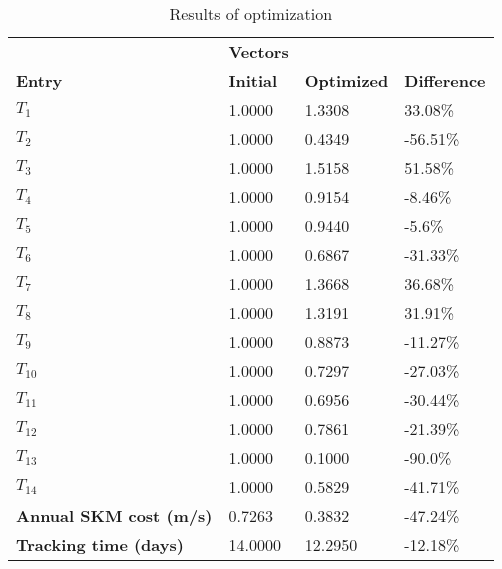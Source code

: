 \begin{table}[H]
\centering
\begin{tabular}{llll}
\textbf{}      & \cellcolor[HTML]{EFEFEF}\textbf{Vectors} & \textbf{} & \textbf{}         \\
\rowcolor[HTML]{EFEFEF} 
\textbf{Entry} & \textbf{Initial} & \textbf{Optimized} & \textbf{Difference} \\
$T_1$ & 1.0000 & 1.3308 & 33.08\% \\ 
$T_2$ & 1.0000 & 0.4349 & -56.51\% \\ 
$T_3$ & 1.0000 & 1.5158 & 51.58\% \\ 
$T_4$ & 1.0000 & 0.9154 & -8.46\% \\ 
$T_5$ & 1.0000 & 0.9440 & -5.6\% \\ 
$T_6$ & 1.0000 & 0.6867 & -31.33\% \\ 
$T_7$ & 1.0000 & 1.3668 & 36.68\% \\ 
$T_8$ & 1.0000 & 1.3191 & 31.91\% \\ 
$T_9$ & 1.0000 & 0.8873 & -11.27\% \\ 
$T_10$ & 1.0000 & 0.7297 & -27.03\% \\ 
$T_11$ & 1.0000 & 0.6956 & -30.44\% \\ 
$T_12$ & 1.0000 & 0.7861 & -21.39\% \\ 
$T_13$ & 1.0000 & 0.1000 & -90.0\% \\ 
$T_14$ & 1.0000 & 0.5829 & -41.71\% \\ 
\rowcolor[HTML]{EFEFEF} 
\textbf{Annual SKM cost (m/s)}  & 0.7263 & 0.3832 & -47.24\% \\ 
\rowcolor[HTML]{EFEFEF} 
\textbf{Tracking time (days)}  & 14.0000 & 12.2950 & -12.18\% \\ 
\end{tabular}
\caption{Results of optimization}
\label{tab:OptimizationAnalysis}
\end{table}